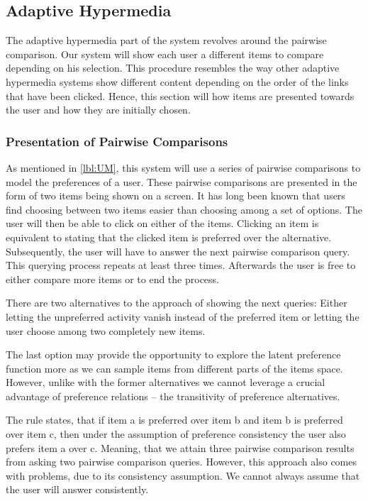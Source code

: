 \documentclass[11pt,a4paper,oneside]{article}
\begin{document}
\subsection{Adaptive Hypermedia}
The adaptive hypermedia part of the system revolves around the pairwise comparison. Our system will show each user a different items to compare depending on his selection. This procedure resembles the way other adaptive hypermedia systems show different content depending on the order of the links that have been clicked. Hence, this section will how items are presented towards the user and how they are initially chosen. 

\subsubsection{Presentation of Pairwise Comparisons}
As mentioned in \autoref{lbl:UM}, this system will use a series of pairwise comparisons to model the preferences of a user. These pairwise comparisons are presented in the form of two items being shown on a screen. It has long been known that users find choosing between two items easier than choosing among a set of options.\cite{COGNITIVE_OVERLOAD} The user will then be able to click on either of the items. Clicking an item is equivalent to stating that the clicked item is preferred over the alternative. Subsequently, the user will have to answer the next pairwise comparison query. This querying process repeats at least three times. Afterwards the user is free to either compare more items or to end the process.

There are two alternatives to the approach of showing the next queries: Either letting the unpreferred activity vanish instead of the preferred item or letting the user choose among two completely new items. 

The last option may provide the opportunity to explore the latent preference function more as we can sample items from different parts of the items space. However, unlike with the former alternatives we cannot leverage a crucial advantage of preference relations -- the transitivity of preference alternatives.

The rule states, that if item a is preferred over item b and item b is preferred over item c, then under the assumption of preference consistency the user also prefers item a over c. Meaning, that we attain three pairwise comparison results from asking two pairwise comparison queries. However, this approach also comes with problems, due to its consistency assumption. We cannot always assume that the user will answer consistently.
\end{document}
